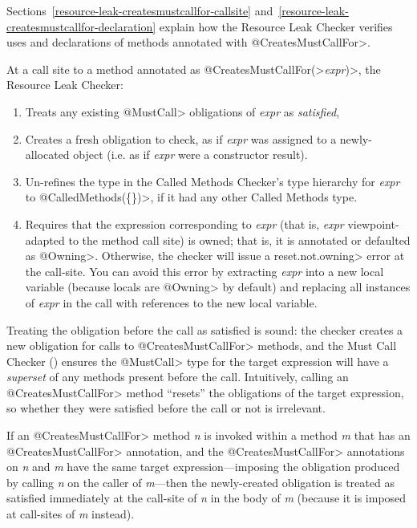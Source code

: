 Sections~\ref{resource-leak-createsmustcallfor-callsite}
and~\ref{resource-leak-createsmustcallfor-declaration}
explain how the Resource Leak Checker verifies uses and declarations of
methods annotated with \<@CreatesMustCallFor>.



At a call site to a method annotated as
\<@CreatesMustCallFor(>\emph{expr}\<)>, the Resource Leak Checker:
\begin{enumerate}
\item
  Treats any existing \<@MustCall> obligations of \emph{expr} as \emph{satisfied},
\item
  Creates a fresh obligation to check, as if \emph{expr} was assigned to a newly-allocated
  object (i.e. as if \emph{expr} were a constructor result).
\item
  Un-refines the type in the Called Methods Checker's type hierarchy for \emph{expr} to
  \<@CalledMethods(\{\})>, if it had any other Called Methods type.
\item
  Requires that the expression corresponding to \emph{expr} (that is, \emph{expr}
  viewpoint-adapted to the method call site) is owned; that is, it is
  annotated or defaulted as \<@Owning>.  Otherwise, the checker
  will issue a \<reset.not.owning> error at the call-site. You can avoid this
  error by extracting \emph{expr} into a new local variable (because
  locals are \<@Owning> by default) and replacing all instances of \emph{expr}
  in the call with references to the new local variable.
\end{enumerate}

Treating the obligation before the call as satisfied is sound: the
checker creates a new obligation for calls to \<@CreatesMustCallFor> methods,
and the Must Call Checker () ensures the
\<@MustCall> type for the target expression will have a \emph{superset} of any methods
present before the call. Intuitively, calling an \<@CreatesMustCallFor> method
``resets'' the obligations of the target expression, so whether they were satisfied before
the call or not is irrelevant.

If an \<@CreatesMustCallFor>
method \emph{n} is invoked within a method \emph{m} that has an \<@CreatesMustCallFor> annotation,
and the \<@CreatesMustCallFor> annotations on \emph{n} and \emph{m} have
the same target expression---imposing the obligation produced by calling \emph{n} on the caller of \emph{m}---then
the newly-created obligation is treated as satisfied immediately
at the call-site of \emph{n} in the body of \emph{m} (because it is imposed at call-sites of \emph{m}
instead).


